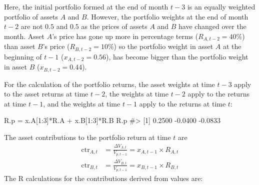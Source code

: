\documentclass[
  letterpaper,
  DIV=11,
  numbers=noendperiod]{scrreprt}
\newenvironment{Shaded}{\begin{snugshade}}{\end{snugshade}}
\newcommand{\CommentTok}[1]{\textcolor[rgb]{0.37,0.37,0.37}{#1}}
\newcommand{\DecValTok}[1]{\textcolor[rgb]{0.68,0.00,0.00}{#1}}
\newcommand{\NormalTok}[1]{\textcolor[rgb]{0.00,0.23,0.31}{#1}}
\newcommand{\OtherTok}[1]{\textcolor[rgb]{0.00,0.23,0.31}{#1}}
\newcommand{\SpecialCharTok}[1]{\textcolor[rgb]{0.37,0.37,0.37}{#1}}
\theoremstyle{definition}
\theoremstyle{definition}
\theoremstyle{remark}
\begin{document}
Here, the initial portfolio formed at the end of month \(t-3\) is an
equally weighted portfolio of assets \(A\) and \(B\). However, the
portfolio weights at the end of month \(t-2\) are not \(0.5\) and
\(0.5\) as the prices of assets \(A\) and \(B\) have changed over the
month. Asset \(A\)'s price has gone up more in percentage terms
(\(R_{A,t-2}=40\%\)) than asset \(B\)'s price (\(R_{B,t-2}=10\%\)) so
the portfolio weight in asset \(A\) at the beginning of \(t-1\)
(\(x_{A,t-2}=0.56\)), has become bigger than the portfolio weight in
asset \(B\) (\(x_{B,t-2} = 0.44\)).

For the calculation of the portfolio returns, the asset weights at time
\(t-3\) apply to the asset returns at time \(t-2\), the weights at time
\(t-2\) apply to the returns at time \(t-1\), and the weights at time
\(t-1\) apply to the returns at time \(t\):

\begin{Shaded}
\begin{Highlighting}[]
\NormalTok{R.p }\OtherTok{=}\NormalTok{ x.A[}\DecValTok{1}\SpecialCharTok{:}\DecValTok{3}\NormalTok{]}\SpecialCharTok{*}\NormalTok{R.A }\SpecialCharTok{+}\NormalTok{ x.B[}\DecValTok{1}\SpecialCharTok{:}\DecValTok{3}\NormalTok{]}\SpecialCharTok{*}\NormalTok{R.B}
\NormalTok{R.p}
\CommentTok{\#\textgreater{} [1]  0.2500 {-}0.0400 {-}0.0833}
\end{Highlighting}
\end{Shaded}

The asset contributions to the portfolio return at time \(t\) are
\begin{align}
\mathrm{ctr}_{A,t} &= \frac{\Delta V_{A,t}}{V_{p,t-1}} = x_{A,t-1}\times R_{A,t}\\
\mathrm{ctr}_{B,t} &= \frac{\Delta V_{B,t}}{V_{p,t-1}} = x_{B,t-1}\times R_{B,t}
\end{align} The R calculations for the contributions derived from values
are:
\end{document}
